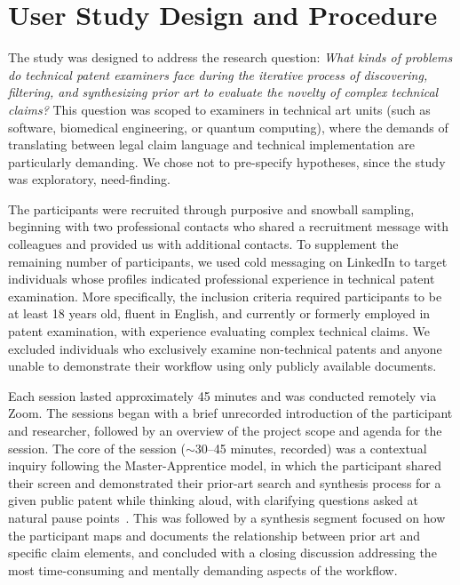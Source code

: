 \documentclass[sigconf]{acmart}
\begin{document}
\section{User Study Design and Procedure}

The study was designed to address the research question: \emph{What kinds of problems do technical patent examiners face during the iterative process of discovering, filtering, and synthesizing prior art to evaluate the novelty of complex technical claims?} This question was scoped to examiners in technical art units (such as software, biomedical engineering, or quantum computing), where the demands of translating between legal claim language and technical implementation are particularly demanding. We chose not to pre-specify hypotheses, since the study was exploratory, need-finding.

The participants were recruited through purposive and snowball sampling, beginning with two professional contacts who shared a recruitment message with colleagues and provided us with additional contacts. To supplement the remaining number of participants, we used cold messaging on LinkedIn to target individuals whose profiles indicated professional experience in technical patent examination. More specifically, the inclusion criteria required participants to be at least 18 years old, fluent in English, and currently or formerly employed in patent examination, with experience evaluating complex technical claims. We excluded individuals who exclusively examine non-technical patents and anyone unable to demonstrate their workflow using only publicly available documents.

Each session lasted approximately 45 minutes and was conducted remotely via Zoom. The sessions began with a brief unrecorded introduction of the participant and researcher, followed by an overview of the project scope and agenda for the session. The core of the session (${\sim}$30--45 minutes, recorded) was a contextual inquiry following the Master-Apprentice model, in which the participant shared their screen and demonstrated their prior-art search and synthesis process for a given public patent while thinking aloud, with clarifying questions asked at natural pause points~\cite{Beyer1997}. This was followed by a synthesis segment focused on how the participant maps and documents the relationship between prior art and specific claim elements, and concluded with a closing discussion addressing the most time-consuming and mentally demanding aspects of the workflow.
\end{document}
